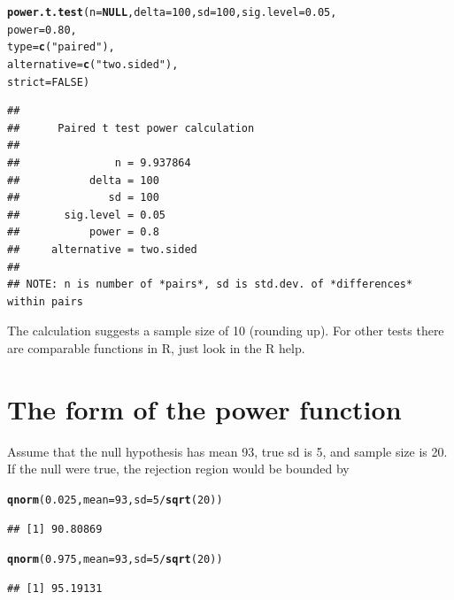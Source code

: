 \documentclass[12pt]{book}\usepackage[]{graphicx}\usepackage[]{color}
\makeatletter
\newcommand{\hlnum}[1]{\textcolor[rgb]{0.686,0.059,0.569}{#1}}%
\newcommand{\hlstr}[1]{\textcolor[rgb]{0.192,0.494,0.8}{#1}}%
\newcommand{\hlopt}[1]{\textcolor[rgb]{0,0,0}{#1}}%
\newcommand{\hlstd}[1]{\textcolor[rgb]{0.345,0.345,0.345}{#1}}%
\newcommand{\hlkwa}[1]{\textcolor[rgb]{0.161,0.373,0.58}{\textbf{#1}}}%
\newcommand{\hlkwc}[1]{\textcolor[rgb]{0.333,0.667,0.333}{#1}}%
\newcommand{\hlkwd}[1]{\textcolor[rgb]{0.737,0.353,0.396}{\textbf{#1}}}%
\newenvironment{kframe}{%
 \def\at@end@of@kframe{}%
 \ifinner\ifhmode%
  \def\at@end@of@kframe{\end{minipage}}%
  \begin{minipage}{\columnwidth}%
 \fi\fi%
 \def\FrameCommand##1{\hskip\@totalleftmargin \hskip-\fboxsep
 \colorbox{shadecolor}{##1}\hskip-\fboxsep
     \hskip-\linewidth \hskip-\@totalleftmargin \hskip\columnwidth}%
 \MakeFramed {\advance\hsize-\width
   \@totalleftmargin\z@ \linewidth\hsize
   \@setminipage}}%
 {\par\unskip\endMakeFramed%
 \at@end@of@kframe}
\newenvironment{knitrout}{}{} %
\makeatother
\begin{document}
\begin{knitrout}
\color{fgcolor}\begin{kframe}
\begin{alltt}
\hlkwd{power.t.test}\hlstd{(}\hlkwc{n} \hlstd{=} \hlkwa{NULL}\hlstd{,} \hlkwc{delta} \hlstd{=} \hlnum{100}\hlstd{,} \hlkwc{sd} \hlstd{=} \hlnum{100}\hlstd{,} \hlkwc{sig.level} \hlstd{=} \hlnum{0.05}\hlstd{,}
             \hlkwc{power} \hlstd{=} \hlnum{0.80}\hlstd{,}
             \hlkwc{type} \hlstd{=} \hlkwd{c}\hlstd{(}\hlstr{"paired"}\hlstd{),}
             \hlkwc{alternative} \hlstd{=} \hlkwd{c}\hlstd{(}\hlstr{"two.sided"}\hlstd{),}
             \hlkwc{strict} \hlstd{=} \hlnum{FALSE}\hlstd{)}
\end{alltt}
\begin{verbatim}
## 
##      Paired t test power calculation 
## 
##               n = 9.937864
##           delta = 100
##              sd = 100
##       sig.level = 0.05
##           power = 0.8
##     alternative = two.sided
## 
## NOTE: n is number of *pairs*, sd is std.dev. of *differences* within pairs
\end{verbatim}
\end{kframe}
\end{knitrout}

The calculation suggests a sample size of 10 (rounding up). For other tests there are comparable functions in R, just look in the R help.

\section{The form of the power function}

Assume that the null hypothesis has mean 93, true sd is 5, and sample size is 20. If the null were true, the rejection region would be bounded by 

\begin{knitrout}
\color{fgcolor}\begin{kframe}
\begin{alltt}
\hlkwd{qnorm}\hlstd{(}\hlnum{0.025}\hlstd{,}\hlkwc{mean}\hlstd{=}\hlnum{93}\hlstd{,}\hlkwc{sd}\hlstd{=}\hlnum{5}\hlopt{/}\hlkwd{sqrt}\hlstd{(}\hlnum{20}\hlstd{))}
\end{alltt}
\begin{verbatim}
## [1] 90.80869
\end{verbatim}
\begin{alltt}
\hlkwd{qnorm}\hlstd{(}\hlnum{0.975}\hlstd{,}\hlkwc{mean}\hlstd{=}\hlnum{93}\hlstd{,}\hlkwc{sd}\hlstd{=}\hlnum{5}\hlopt{/}\hlkwd{sqrt}\hlstd{(}\hlnum{20}\hlstd{))}
\end{alltt}
\begin{verbatim}
## [1] 95.19131
\end{verbatim}
\end{kframe}
\end{knitrout}
\end{document}
